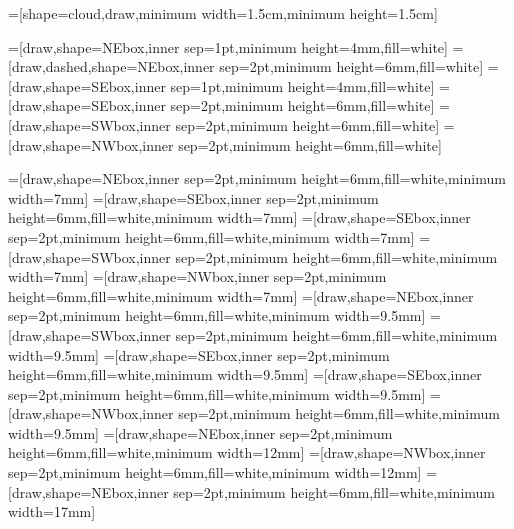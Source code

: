 \makeatother

=[shape=cloud,draw,minimum width=1.5cm,minimum height=1.5cm]

=[draw,shape=NEbox,inner sep=1pt,minimum height=4mm,fill=white]
=[draw,dashed,shape=NEbox,inner sep=2pt,minimum height=6mm,fill=white]
=[draw,shape=SEbox,inner sep=1pt,minimum height=4mm,fill=white]
=[draw,shape=SEbox,inner sep=2pt,minimum height=6mm,fill=white]
=[draw,shape=SWbox,inner sep=2pt,minimum height=6mm,fill=white]
=[draw,shape=NWbox,inner sep=2pt,minimum height=6mm,fill=white]

=[draw,shape=NEbox,inner sep=2pt,minimum height=6mm,fill=white,minimum width=7mm]
=[draw,shape=SEbox,inner sep=2pt,minimum height=6mm,fill=white,minimum width=7mm]
=[draw,shape=SEbox,inner sep=2pt,minimum height=6mm,fill=white,minimum width=7mm]
=[draw,shape=SWbox,inner sep=2pt,minimum height=6mm,fill=white,minimum width=7mm]
=[draw,shape=NWbox,inner sep=2pt,minimum height=6mm,fill=white,minimum width=7mm]
=[draw,shape=NEbox,inner sep=2pt,minimum height=6mm,fill=white,minimum width=9.5mm]
=[draw,shape=SWbox,inner sep=2pt,minimum height=6mm,fill=white,minimum width=9.5mm]
=[draw,shape=SEbox,inner sep=2pt,minimum height=6mm,fill=white,minimum width=9.5mm]
=[draw,shape=SEbox,inner sep=2pt,minimum height=6mm,fill=white,minimum width=9.5mm]
=[draw,shape=NWbox,inner sep=2pt,minimum height=6mm,fill=white,minimum width=9.5mm]
=[draw,shape=NEbox,inner sep=2pt,minimum height=6mm,fill=white,minimum width=12mm]
=[draw,shape=NWbox,inner sep=2pt,minimum height=6mm,fill=white,minimum width=12mm]
=[draw,shape=NEbox,inner sep=2pt,minimum height=6mm,fill=white,minimum width=17mm]

